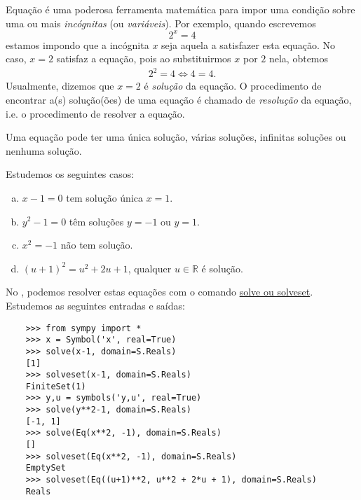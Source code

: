 Equação é uma poderosa ferramenta matemática para impor uma condição sobre uma ou mais \emph{incógnitas} (ou \emph{variáveis}). Por exemplo, quando escrevemos
\begin{equation}
  2^x = 4
\end{equation}
estamos impondo que a incógnita $x$ seja aquela a satisfazer esta equação. No caso, $x=2$ satisfaz a equação, pois ao substituirmos $x$ por $2$ nela, obtemos
\begin{gather}
  2^2 = 4
  \Leftrightarrow 4 = 4.
\end{gather}
Usualmente, dizemos que $x=2$ é \emph{solução} da equação. O procedimento de encontrar a(s) solução(ões) de uma equação é chamado de \emph{resolução} da equação, i.e. o procedimento de resolver a equação.

\begin{obs}
  Uma equação pode ter uma única solução, várias soluções, infinitas soluções ou nenhuma solução.
\end{obs}

\begin{ex}
  Estudemos os seguintes casos:
  \begin{enumerate}[a)]
  \item $x - 1 = 0$ tem solução única $x=1$.
  \item $y^2 - 1 = 0$ têm soluções $y=-1$ ou $y=1$.
  \item $x^2 = -1$ não tem solução.
  \item $(u+1)^2 = u^2 + 2u + 1$, qualquer $u\in\mathbb{R}$ é solução.
  \end{enumerate}

  \ifispython
  No \python, podemos resolver estas equações com o comando \href{https://docs.sympy.org/latest/tutorial/solvers.html#solving-equations-algebraically}{solve ou solveset}. Estudemos as seguintes entradas e saídas:
  \begin{lstlisting}
    >>> from sympy import *
    >>> x = Symbol('x', real=True)
    >>> solve(x-1, domain=S.Reals)
    [1]
    >>> solveset(x-1, domain=S.Reals)
    FiniteSet(1)
    >>> y,u = symbols('y,u', real=True)
    >>> solve(y**2-1, domain=S.Reals)
    [-1, 1]
    >>> solve(Eq(x**2, -1), domain=S.Reals)
    []
    >>> solveset(Eq(x**2, -1), domain=S.Reals)
    EmptySet
    >>> solveset(Eq((u+1)**2, u**2 + 2*u + 1), domain=S.Reals)
    Reals
  \end{lstlisting}
  \fi
\end{ex}

